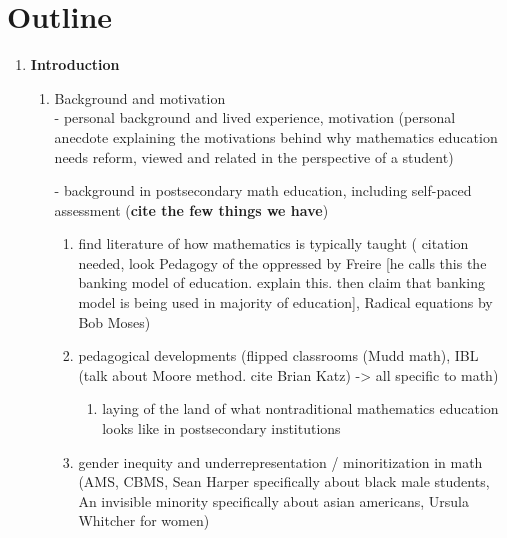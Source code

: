 \chapter{Outline}
\begin{enumerate}
  \item {\bf Introduction }
  \begin{enumerate}
    \item Background and motivation \\
      - personal background and lived experience, motivation
        (personal anecdote explaining the motivations behind why mathematics education needs reform, viewed and related in the perspective of a student)

      - background in postsecondary math education, including self-paced assessment ({\bf cite the few things we have})

      \begin{enumerate}
        \item find literature of how mathematics is typically taught ( citation needed, look Pedagogy of the oppressed by Freire [he calls this the banking model of education. explain this. then claim that banking model is being used in majority of education], Radical equations by Bob Moses)
        \item pedagogical developments (flipped classrooms (Mudd math), IBL (talk about Moore method. cite Brian Katz) -> all specific to math)
        \begin{enumerate}
          \item laying of the land of what nontraditional mathematics education looks like in postsecondary institutions
        \end{enumerate}
        \item gender inequity and underrepresentation / minoritization in math (AMS, CBMS, Sean Harper specifically about black male students, An invisible minority specifically about asian americans, Ursula Whitcher for women)
      \end{enumerate}


\end{enumerate}
\end{enumerate}
